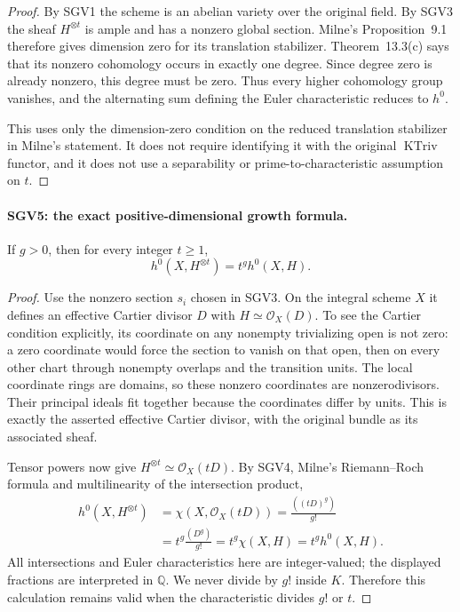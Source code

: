 \begin{proof}
By SGV1 the scheme is an abelian variety over the original field.
By SGV3 the sheaf $H^{\otimes t}$ is ample and has a nonzero
global section.  Milne's Proposition~9.1 therefore gives dimension
zero for its translation stabilizer.  Theorem~13.3(c) says that its
nonzero cohomology occurs in exactly one degree.  Since degree zero
is already nonzero, this degree must be zero.  Thus every higher
cohomology group vanishes, and the alternating sum defining the Euler
characteristic reduces to $h^0$.

This uses only the dimension-zero condition on the reduced translation
stabilizer in Milne's statement.  It does not require identifying it
with the original $\operatorname{KTriv}$ functor, and it does not use a
separability or prime-to-characteristic assumption on $t$.
\end{proof}

\paragraph{SGV5: the exact positive-dimensional growth formula.}
\label{claim:SGV5}
If $g>0$, then for every integer $t\ge1$,
\[
 h^0(X,H^{\otimes t})=t^g h^0(X,H).
                                                        \tag{SGV.5}
\]

\begin{proof}
Use the nonzero section $s_i$ chosen in SGV3.  On the integral scheme
$X$ it defines an effective Cartier divisor $D$ with
$H\simeq\mathcal O_X(D)$.  To see the Cartier condition explicitly,
its coordinate on any nonempty trivializing open is not zero: a zero
coordinate would force the section to vanish on that open, then on
every other chart through nonempty overlaps and the transition units.
The local coordinate rings are domains, so these nonzero coordinates
are nonzerodivisors.  Their principal ideals fit together because the
coordinates differ by units.  This is exactly the asserted effective
Cartier divisor, with the original bundle as its associated sheaf.

Tensor powers now give $H^{\otimes t}\simeq\mathcal O_X(tD)$.
By SGV4, Milne's Riemann--Roch formula and multilinearity of the
intersection product,
\[
 \begin{aligned}
 h^0(X,H^{\otimes t})
   &=\chi(X,\mathcal O_X(tD))
     =\frac{((tD)^g)}{g!}\\
   &=t^g\frac{(D^g)}{g!}
     =t^g\chi(X,H)
     =t^g h^0(X,H).
 \end{aligned}
\]
All intersections and Euler characteristics here are integer-valued;
the displayed fractions are interpreted in $\mathbb Q$.  We never
divide by $g!$ inside $K$.  Therefore this calculation remains valid
when the characteristic divides $g!$ or $t$.
\end{proof}

